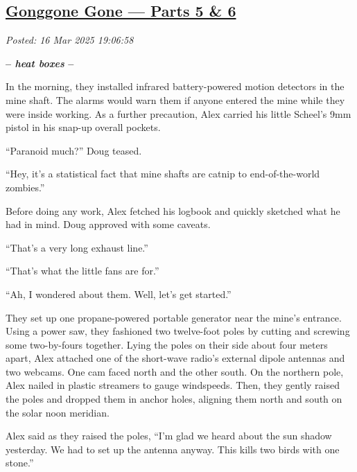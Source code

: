 %

\subsection*{\href{http://analyzethedatanotthedrivel.org/2025/03/16/gonggone-gone-parts-5-6/}{Gonggone Gone --- Parts 5 \& 6}}


\noindent\emph{Posted: 16 Mar 2025 19:06:58}
\vspace{6pt}

\begin{center}\large\textbf{-- \emph{heat boxes} --}\normalsize\end{center}

In the morning, they installed infrared battery-powered motion detectors
in the mine shaft. The alarms would warn them if anyone entered the mine
while they were inside working. As a further precaution, Alex carried
his little Scheel's 9mm pistol in his snap-up overall pockets.

``Paranoid much?'' Doug teased.

``Hey, it's a statistical fact that mine shafts are catnip to
end-of-the-world zombies.''

Before doing any work, Alex fetched his logbook and quickly sketched
what he had in mind. Doug approved with some caveats.

``That's a very long exhaust line.''

``That's what the little fans are for.''

``Ah, I wondered about them. Well, let's get started.''

They set up one propane-powered portable generator near the mine's
entrance. Using a power saw, they fashioned two twelve-foot poles by
cutting and screwing some two-by-fours together. Lying the poles on
their side about four meters apart, Alex attached one of the short-wave
radio's external dipole antennas and two webcams. One cam faced north
and the other south. On the northern pole, Alex nailed in plastic
streamers to gauge windspeeds. Then, they gently raised the poles and
dropped them in anchor holes, aligning them north and south on the solar
noon meridian.

Alex said as they raised the poles, ``I'm glad we heard about the sun
shadow yesterday. We had to set up the antenna anyway. This kills two
birds with one stone.''

